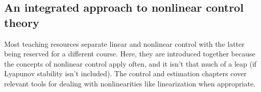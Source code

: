 \subsection{An integrated approach to nonlinear control theory}

Most teaching resources separate linear and nonlinear control with the latter
being reserved for a different course. Here, they are introduced together
because the concepts of nonlinear control apply often, and it isn't that much of
a leap (if Lyapunov stability isn't included). The control and estimation
chapters cover relevant tools for dealing with nonlinearities like linearization
when appropriate.
